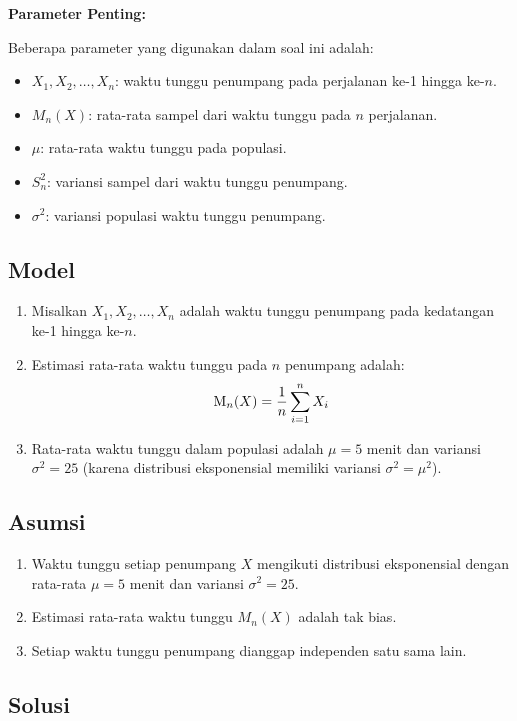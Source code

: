 \documentclass{article}
\begin{document}
\textbf{Parameter Penting:}

Beberapa parameter yang digunakan dalam soal ini adalah:
\begin{itemize}
    \item \( X_1, X_2, \dots, X_n \): waktu tunggu penumpang pada perjalanan ke-1 hingga ke-\( n \).
    \item \( M_n(X) \): rata-rata sampel dari waktu tunggu pada \( n \) perjalanan.
    \item \( \mu \): rata-rata waktu tunggu pada populasi.
    \item \( S_n^2 \): variansi sampel dari waktu tunggu penumpang.
    \item \( \sigma^2 \): variansi populasi waktu tunggu penumpang.
\end{itemize}

\subsection{Model}
\begin{enumerate}
    \item Misalkan \( X_1, X_2, \dots, X_n \) adalah waktu tunggu penumpang pada kedatangan ke-1 hingga ke-\( n \). 
    \item Estimasi rata-rata waktu tunggu pada \( n \) penumpang adalah: 
    \[
    \text M_n(X) = \frac{1}{n} \sum_{i=1}^n X_i
    \]
    \item Rata-rata waktu tunggu dalam populasi adalah $\mu = 5$ menit dan variansi $\sigma^2 = 25$ (karena distribusi eksponensial memiliki variansi $\sigma^2 = \mu^2$).
\end{enumerate}
\subsection{Asumsi}
\begin{enumerate}
    \item Waktu tunggu setiap penumpang $X$ mengikuti distribusi eksponensial dengan rata-rata $\mu = 5$ menit dan variansi $\sigma^2 = 25$.
    \item Estimasi rata-rata waktu tunggu $M_n(X)$ adalah tak bias.
    \item Setiap waktu tunggu penumpang dianggap independen satu sama lain.
\end{enumerate}
\subsection{Solusi}
\end{document}
